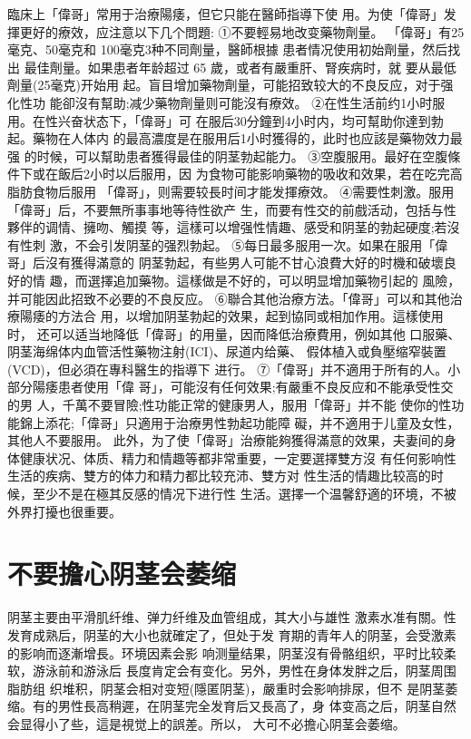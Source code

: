 \documentclass[12pt,UTF8]{ctexbook}
\begin{document}
臨床上「偉哥」常用于治療陽痿，但它只能在醫師指導下使
用。为使「偉哥」发揮更好的療效，应注意以下几个問題:
①不要輕易地改变藥物劑量。
「偉哥」有25毫克、50毫克和
100毫克3种不同劑量，醫師根據
患者情况使用初始劑量，然后找出
最佳劑量。如果患者年龄超过 65
歲，或者有嚴重肝、腎疾病时，就
要从最低劑量(25毫克)开始用
起。盲目增加藥物劑量，可能招致较大的不良反应，对于强化性功
能卻沒有幫助;减少藥物劑量则可能沒有療效。
②在性生活前约1小时服用。在性兴奋状态下，「偉哥」可
在服后30分鐘到4小时内，均可幫助你達到勃起。藥物在人体内
的最高濃度是在服用后1小时獲得的，此时也应該是藥物效力最强
的时候，可以幫助患者獲得最佳的阴茎勃起能力。
③空腹服用。最好在空腹條件下或在飯后2小时以后服用，因
为食物可能影响藥物的吸收和效果，若在吃完高脂肪食物后服用
「偉哥」，则需要较長时间才能发揮療效。
④需要性刺激。服用「偉哥」后，不要無所事事地等待性欲产
生，而要有性交的前戲活动，包括与性夥伴的调情、擁吻、觸摸
等，這樣可以增强性情趣、感受和阴茎的勃起硬度;若沒有性刺
激，不会引发阴茎的强烈勃起。
⑤每日最多服用一次。如果在服用「偉哥」后沒有獲得滿意的
阴茎勃起，有些男人可能不甘心浪費大好的时機和破壞良好的情
趣，而選擇追加藥物。這樣做是不好的，可以明显增加藥物引起的
風險，并可能因此招致不必要的不良反应。
⑥聯合其他治療方法。「偉哥」可以和其他治療陽痿的方法合
用，以增加阴茎勃起的效果，起到協同或相加作用。這樣使用时，
还可以适当地降低「偉哥」的用量，因而降低治療費用，例如其他
口服藥、阴茎海绵体内血管活性藥物注射(ICI)、尿道内给藥、
假体植入或負壓缩窄裝置(VCD)，但必須在專科醫生的指導下
进行。
⑦「偉哥」并不適用于所有的人。小部分陽痿患者使用「偉
哥」，可能沒有任何效果;有嚴重不良反应和不能承受性交的男
人，千萬不要冒險;性功能正常的健康男人，服用「偉哥」并不能
使你的性功能錦上添花;「偉哥」只適用于治療男性勃起功能障
礙，并不適用于儿童及女性，其他人不要服用。
此外，为了使「偉哥」治療能夠獲得滿意的效果，夫妻间的身
体健康状况、体质、精力和情趣等都非常重要，一定要選擇雙方沒
有任何影响性生活的疾病、雙方的体力和精力都比较充沛、雙方对
性生活的情趣比较高的时候，至少不是在極其反感的情况下进行性
生活。選擇一个温馨舒適的环境，不被外界打擾也很重要。
\section{不要擔心阴茎会萎缩}
阴茎主要由平滑肌纤维、弹力纤维及血管组成，其大小与雄性
激素水准有關。性发育成熟后，阴茎的大小也就確定了，但处于发
育期的青年人的阴茎，会受激素的影响而逐漸增長。环境因素会影
响测量结果，阴茎沒有骨骼组织，平时比较柔软，游泳前和游泳后
長度肯定会有变化。另外，男性在身体发胖之后，阴茎周围脂肪组
织堆积，阴茎会相对变短(隱匿阴茎)，嚴重时会影响排尿，但不
是阴茎萎缩。有的男性長高稍遲，在阴茎完全发育后又長高了，身
体变高之后，阴茎自然会显得小了些，這是視觉上的誤差。所以，
大可不必擔心阴茎会萎缩。
\end{document}
